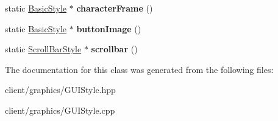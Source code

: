 \begin{DoxyCompactItemize}
\item 
\hypertarget{classgraphics_1_1_g_u_i_style_a544e9c8a2c6fa6a2b4b14cdbe13f0d25}{static \hyperlink{classgraphics_1_1_basic_style}{Basic\-Style} $\ast$ {\bfseries character\-Frame} ()}\label{classgraphics_1_1_g_u_i_style_a544e9c8a2c6fa6a2b4b14cdbe13f0d25}

\item 
\hypertarget{classgraphics_1_1_g_u_i_style_a5acf59fcb870838b6e03af0ca447dab9}{static \hyperlink{classgraphics_1_1_basic_style}{Basic\-Style} $\ast$ {\bfseries button\-Image} ()}\label{classgraphics_1_1_g_u_i_style_a5acf59fcb870838b6e03af0ca447dab9}

\item 
\hypertarget{classgraphics_1_1_g_u_i_style_a69cd1567081fd107d487858dcd7f6752}{static \hyperlink{classgraphics_1_1_scroll_bar_style}{Scroll\-Bar\-Style} $\ast$ {\bfseries scrollbar} ()}\label{classgraphics_1_1_g_u_i_style_a69cd1567081fd107d487858dcd7f6752}

\end{DoxyCompactItemize}


The documentation for this class was generated from the following files\-:\begin{DoxyCompactItemize}
\item 
client/graphics/G\-U\-I\-Style.\-hpp\item 
client/graphics/G\-U\-I\-Style.\-cpp\end{DoxyCompactItemize}
